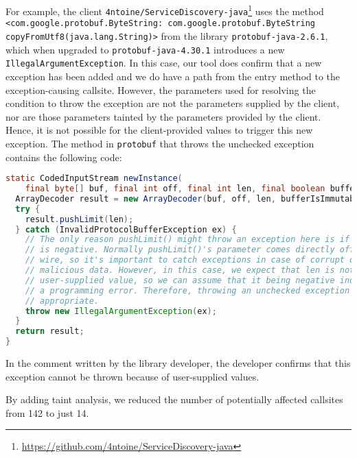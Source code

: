 For example, the client \texttt{4ntoine/ServiceDiscovery-java}\footnote{\url{https://github.com/4ntoine/ServiceDiscovery-java}} uses the method \texttt{<com.google.protobuf.ByteString: com.google.protobuf.ByteString copyFromUtf8(java.lang.String)>}
from the library \texttt{protobuf-java-2.6.1}, which when upgraded to \texttt{protobuf-java-4.30.1} introduces a new \texttt{IllegalArgumentException}. In this case, our tool
does confirm that a new exception has been added and we do have a path from the entry method to the exception-causing callsite. However, the
parameters used for resolving the condition to throw the exception are not the parameters supplied by the client, nor
are those parameters tainted by the parameters provided by the client. Hence, it is not possible for the client-provided values
to trigger this new exception. The method in \texttt{protobuf} that throws the unchecked exception contains the following code:

\begin{lstlisting}[language=Java,breaklines=true,basicstyle=\scriptsize\ttfamily]
static CodedInputStream newInstance(
    final byte[] buf, final int off, final int len, final boolean bufferIsImmutable) {
  ArrayDecoder result = new ArrayDecoder(buf, off, len, bufferIsImmutable);
  try {
    result.pushLimit(len);
  } catch (InvalidProtocolBufferException ex) {
    // The only reason pushLimit() might throw an exception here is if len
    // is negative. Normally pushLimit()'s parameter comes directly off the
    // wire, so it's important to catch exceptions in case of corrupt or
    // malicious data. However, in this case, we expect that len is not a
    // user-supplied value, so we can assume that it being negative indicates
    // a programming error. Therefore, throwing an unchecked exception is
    // appropriate.
    throw new IllegalArgumentException(ex);
  }
  return result;
}
\end{lstlisting}

In the comment written by the library developer, the developer confirms that this exception cannot be thrown because of
user-supplied values.

\vspace{1em}
\begin{tcolorbox}[colback=gray!10, colframe=black]
By adding taint analysis, we reduced the number of potentially affected callsites from 142 to just 14.
\end{tcolorbox}
\vspace{1em}



